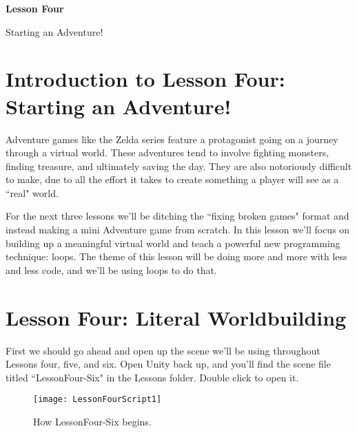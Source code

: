 \documentclass{article}
\begin{document}
\vspace*{\fill}
\begin{center}
{\Huge\bf Lesson Four}

\vspace{2\baselineskip}

{\huge Starting an Adventure!}
\end{center}
\vspace*{\fill}
\newpage


\section{Introduction to Lesson Four: Starting an Adventure!}

Adventure games like the Zelda series feature a protagonist going on a journey through a virtual world. These adventures tend to involve fighting monsters, finding treasure, and ultimately saving the day. They are also notoriously difficult to make, due to all the effort it takes to create something a player will see as a ``real" world. 

For the next three lessons we'll be ditching the ``fixing broken games" format and instead making a mini Adventure game from scratch. In this lesson we'll focus on building up a meaningful virtual world and teach a powerful new programming technique: loops. The theme of this lesson will be doing more and more with less and less code, and we'll be using loops to do that.

\section{Lesson Four: Literal Worldbuilding}

First we should go ahead and open up the scene we'll be using throughout Lessons four, five, and six. Open Unity back up, and you'll find the scene file titled ``LessonFour-Six" in the Lessons folder. Double click to open it. 

\noindent{}

\begin{figure}
  \texttt{[image: LessonFourScript1]}
  \caption{How LessonFour-Six begins.}
  \label{fig:LessonFourScript1}
\end{figure}
\end{document}
